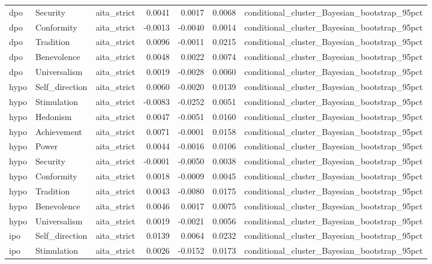\begin{tabular}{lllrrrl}
dpo & Security & aita\_strict & 0.0041 & 0.0017 & 0.0068 & conditional\_cluster\_Bayesian\_bootstrap\_95pct \\
dpo & Conformity & aita\_strict & -0.0013 & -0.0040 & 0.0014 & conditional\_cluster\_Bayesian\_bootstrap\_95pct \\
dpo & Tradition & aita\_strict & 0.0096 & -0.0011 & 0.0215 & conditional\_cluster\_Bayesian\_bootstrap\_95pct \\
dpo & Benevolence & aita\_strict & 0.0048 & 0.0022 & 0.0074 & conditional\_cluster\_Bayesian\_bootstrap\_95pct \\
dpo & Universalism & aita\_strict & 0.0019 & -0.0028 & 0.0060 & conditional\_cluster\_Bayesian\_bootstrap\_95pct \\
hypo & Self\_direction & aita\_strict & 0.0060 & -0.0020 & 0.0139 & conditional\_cluster\_Bayesian\_bootstrap\_95pct \\
hypo & Stimulation & aita\_strict & -0.0083 & -0.0252 & 0.0051 & conditional\_cluster\_Bayesian\_bootstrap\_95pct \\
hypo & Hedonism & aita\_strict & 0.0047 & -0.0051 & 0.0160 & conditional\_cluster\_Bayesian\_bootstrap\_95pct \\
hypo & Achievement & aita\_strict & 0.0071 & -0.0001 & 0.0158 & conditional\_cluster\_Bayesian\_bootstrap\_95pct \\
hypo & Power & aita\_strict & 0.0044 & -0.0016 & 0.0106 & conditional\_cluster\_Bayesian\_bootstrap\_95pct \\
hypo & Security & aita\_strict & -0.0001 & -0.0050 & 0.0038 & conditional\_cluster\_Bayesian\_bootstrap\_95pct \\
hypo & Conformity & aita\_strict & 0.0018 & -0.0009 & 0.0045 & conditional\_cluster\_Bayesian\_bootstrap\_95pct \\
hypo & Tradition & aita\_strict & 0.0043 & -0.0080 & 0.0175 & conditional\_cluster\_Bayesian\_bootstrap\_95pct \\
hypo & Benevolence & aita\_strict & 0.0046 & 0.0017 & 0.0075 & conditional\_cluster\_Bayesian\_bootstrap\_95pct \\
hypo & Universalism & aita\_strict & 0.0019 & -0.0021 & 0.0056 & conditional\_cluster\_Bayesian\_bootstrap\_95pct \\
ipo & Self\_direction & aita\_strict & 0.0139 & 0.0064 & 0.0232 & conditional\_cluster\_Bayesian\_bootstrap\_95pct \\
ipo & Stimulation & aita\_strict & 0.0026 & -0.0152 & 0.0173 & conditional\_cluster\_Bayesian\_bootstrap\_95pct \\

\end{tabular}
